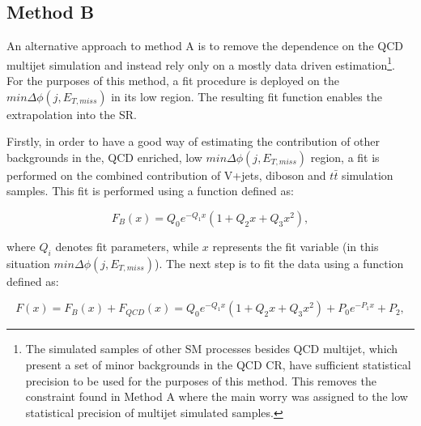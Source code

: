 \subsection{Method B}
\label{sec:qcd_b}
\hspace{10pt} An alternative approach to method A is to remove the dependence on the QCD multijet simulation and instead rely only on a mostly data driven estimation\footnote{The simulated samples of other SM processes besides QCD multijet, which present a set of minor backgrounds in the QCD CR, have sufficient statistical precision to be used for the purposes of this method. This removes the constraint found in Method A where the main worry was assigned to the low statistical precision of multijet simulated samples.}. For the purposes of this method, a fit procedure is deployed on the $min\Delta\phi(j, E_{T, miss})$ in its low region. The resulting fit function enables the extrapolation into the SR.

\hspace{10pt} Firstly, in order to have a good way of estimating the contribution of other backgrounds in the, QCD enriched, low $min\Delta\phi(j, E_{T, miss})$ region, a fit is performed on the combined contribution of V+jets, diboson and $t\bar{t}$ simulation samples. This fit is performed using a function defined as:

\begin{equation}
    F_B(x)  = Q_0e^{-Q_1x}(1+Q_2x+Q_3x^2),
\end{equation}

where $Q_i$ denotes fit parameters, while $x$ represents the fit variable (in this situation $min\Delta\phi(j, E_{T, miss})$). The next step is to fit the data using a function defined as:

\begin{equation}
    F(x) = F_B(x)+F_{QCD}(x) = Q_0e^{-Q_1x}(1+Q_2x+Q_3x^2)+P_0e^{-P_1x}+P_2,
\end{equation}

